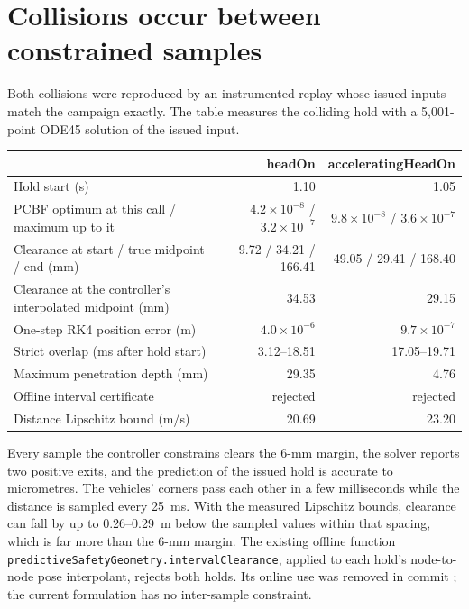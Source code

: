 \documentclass[11pt]{article}
\begin{document}
\section{Collisions occur between constrained samples}
Both collisions were reproduced by an instrumented replay whose issued inputs
match the campaign exactly. The table measures the colliding hold with a
5{,}001-point ODE45 solution of the issued input.
\begin{center}\footnotesize
\begin{tabular}{lrr}
\toprule
 & headOn & acceleratingHeadOn\\
\midrule
Hold start (s) & 1.10 & 1.05\\
PCBF optimum at this call / maximum up to it & $4.2\times10^{-8}$ / $3.2\times10^{-7}$ & $9.8\times10^{-8}$ / $3.6\times10^{-7}$\\
Clearance at start / true midpoint / end (mm) & 9.72 / 34.21 / 166.41 & 49.05 / 29.41 / 168.40\\
Clearance at the controller's interpolated midpoint (mm) & 34.53 & 29.15\\
One-step RK4 position error (m) & $4.0\times10^{-6}$ & $9.7\times10^{-7}$\\
Strict overlap (ms after hold start) & 3.12--18.51 & 17.05--19.71\\
Maximum penetration depth (mm) & 29.35 & 4.76\\
Offline interval certificate & rejected & rejected\\
Distance Lipschitz bound (m/s) & 20.69 & 23.20\\
\bottomrule
\end{tabular}\end{center}
Every sample the controller constrains clears the 6-mm margin, the solver
reports two positive exits, and the prediction of the issued hold is accurate
to micrometres. The vehicles' corners pass each other in a few milliseconds
while the distance is sampled every 25~ms. With the measured Lipschitz bounds,
clearance can fall by up to 0.26--0.29~m below the sampled values within
that spacing, which is far more than the 6-mm margin. The existing offline
function \texttt{predictiveSafetyGeometry.intervalClearance}, applied to each
hold's node-to-node pose interpolant, rejects both holds. Its online use was
removed in commit ; the current formulation has no
inter-sample constraint.
\end{document}
